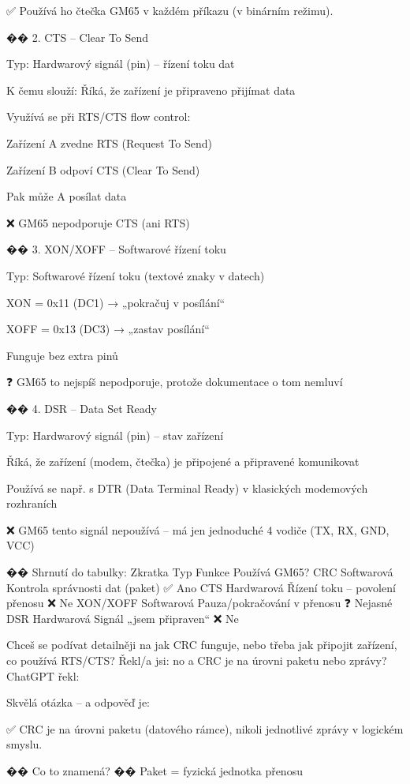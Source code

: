     ✅ Používá ho čtečka GM65 v každém příkazu (v binárním režimu).

�� 2. CTS – Clear To Send

    Typ: Hardwarový signál (pin) – řízení toku dat

    K čemu slouží: Říká, že zařízení je připraveno přijímat data

    Využívá se při RTS/CTS flow control:

        Zařízení A zvedne RTS (Request To Send)

        Zařízení B odpoví CTS (Clear To Send)

        Pak může A posílat data

    ❌ GM65 nepodporuje CTS (ani RTS)

�� 3. XON/XOFF – Softwarové řízení toku

    Typ: Softwarové řízení toku (textové znaky v datech)

    XON = 0x11 (DC1) → „pokračuj v posílání“

    XOFF = 0x13 (DC3) → „zastav posílání“

    Funguje bez extra pinů

    ❓ GM65 to nejspíš nepodporuje, protože dokumentace o tom nemluví

�� 4. DSR – Data Set Ready

    Typ: Hardwarový signál (pin) – stav zařízení

    Říká, že zařízení (modem, čtečka) je připojené a připravené komunikovat

    Používá se např. s DTR (Data Terminal Ready) v klasických modemových rozhraních

    ❌ GM65 tento signál nepoužívá – má jen jednoduché 4 vodiče (TX, RX, GND, VCC)

�� Shrnutí do tabulky:
Zkratka	Typ	Funkce	Používá GM65?
CRC	Softwarová	Kontrola správnosti dat (paket)	✅ Ano
CTS	Hardwarová	Řízení toku – povolení přenosu	❌ Ne
XON/XOFF	Softwarová	Pauza/pokračování v přenosu	❓ Nejasné
DSR	Hardwarová	Signál „jsem připraven“	❌ Ne

Chceš se podívat detailněji na jak CRC funguje, nebo třeba jak připojit zařízení, co používá RTS/CTS?
Řekl/a jsi:
no a CRC je na úrovni paketu nebo zprávy?
ChatGPT řekl:

Skvělá otázka – a odpověď je:

    ✅ CRC je na úrovni paketu (datového rámce), nikoli jednotlivé zprávy v logickém smyslu.

�� Co to znamená?
�� Paket = fyzická jednotka přenosu

